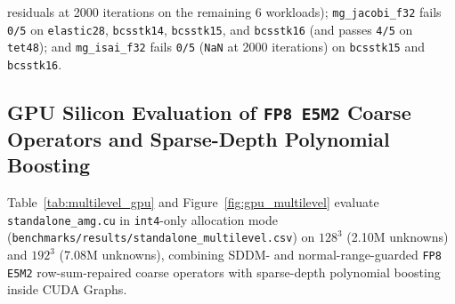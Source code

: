 \documentclass[10pt]{article}
\begin{document}
\begin{enumerate}
residuals at 2000 iterations on the remaining 6 workloads); \texttt{mg\_jacobi\_f32} fails \texttt{0/5} on \texttt{elastic28}, \texttt{bcsstk14}, \texttt{bcsstk15}, and \texttt{bcsstk16} (and passes \texttt{4/5} on \texttt{tet48}); and \texttt{mg\_isai\_f32} fails \texttt{0/5} (\texttt{NaN} at 2000 iterations) on \texttt{bcsstk15} and \texttt{bcsstk16}.
\end{enumerate}

\subsection{GPU Silicon Evaluation of \texttt{FP8 E5M2} Coarse Operators and Sparse-Depth Polynomial Boosting}\label{sec:multilevel_eval}
Table~\ref{tab:multilevel_gpu} and Figure~\ref{fig:gpu_multilevel} evaluate \texttt{standalone\_amg.cu} in \texttt{int4}-only allocation mode (\texttt{benchmarks/results/standalone\_multilevel.csv}) on $128^3$ (2.10M unknowns) and $192^3$ (7.08M unknowns), combining SDDM- and normal-range-guarded \texttt{FP8 E5M2} row-sum-repaired coarse operators with sparse-depth polynomial boosting inside CUDA Graphs.
\end{document}
